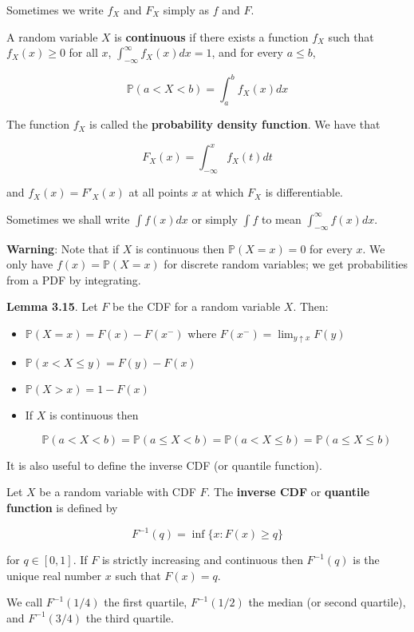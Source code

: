 Sometimes we write \(f_X\) and \(F_X\) simply as \(f\) and \(F\).

A random variable \(X\) is \textbf{continuous} if there exists a
function \(f_X\) such that \(f_X(x) \geq 0\) for all \(x\),
\(\int_{-\infty}^\infty f_X(x) dx = 1\), and for every \(a \leq b\),

\[ \mathbb{P}(a < X < b) = \int_a^b f_X(x) dx \]

The function \(f_X\) is called the \textbf{probability density
function}. We have that

\[ F_X(x) = \int_{-\infty}^x f_X(t) dt \]

and \(f_X(x) = F'_X(x)\) at all points \(x\) at which \(F_X\) is
differentiable.

Sometimes we shall write \(\int f(x) dx\) or simply \(\int f\) to mean
\(\int_{-\infty}^\infty f(x) dx\).

\textbf{Warning}: Note that if \(X\) is continuous then
\(\mathbb{P}(X = x) = 0\) for every \(x\). We only have
\(f(x) = \mathbb{P}(X = x)\) for discrete random variables; we get
probabilities from a PDF by integrating.

\textbf{Lemma 3.15}. Let \(F\) be the CDF for a random variable \(X\).
Then:

\begin{itemize}
\item
  \(\mathbb{P}(X = x) = F(x) - F(x^-)\) where
  \(F(x^-) = \lim_{y \uparrow x} F(y)\)
\item
  \(\mathbb{P}(x < X \leq y) = F(y) - F(x)\)
\item
  \(\mathbb{P}(X > x) = 1 - F(x)\)
\item
  If \(X\) is continuous then

  \[ \mathbb{P}(a < X < b) = \mathbb{P}(a \leq X < b) = \mathbb{P}(a < X \leq b) = \mathbb{P}(a \leq X \leq b) \]
\end{itemize}

It is also useful to define the inverse CDF (or quantile function).

Let \(X\) be a random variable with CDF \(F\). The \textbf{inverse CDF}
or \textbf{quantile function} is defined by

\[ F^{-1}(q) = \inf \{ x : F(x) \ge q \} \]

for \(q \in [0, 1]\). If \(F\) is strictly increasing and continuous
then \(F^{-1}(q)\) is the unique real number \(x\) such that
\(F(x) = q\).

We call \(F^{-1}(1/4)\) the first quartile, \(F^{-1}(1/2)\) the median
(or second quartile), and \(F^{-1}(3/4)\) the third quartile.

